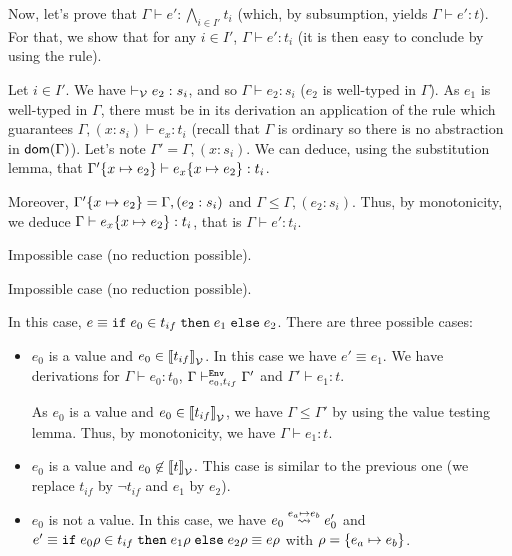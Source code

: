 \documentclass[a4paper]{article}
\theoremstyle{definition}
\begin{document}
\begin{description}
\begin{itemize}
            Now, let's prove that $\Gamma \vdash e':\bigwedge_{i\in I'} t_i$ (which, by subsumption,
            yields $\Gamma \vdash e': t$). For that, we show that for any $i\in I'$, $\Gamma \vdash e':t_i$
            (it is then easy to conclude by using the  rule).

            Let $i\in I'$. We have $\vdash_{\mathcal{V}} e_2:s_i$, and so $\Gamma \vdash e_2:s_i$ ($e_2$ is well-typed in $\Gamma$).
            As $e_1$ is well-typed in $\Gamma$, there must be in its derivation an application of the rule 
            which guarantees $\Gamma,(x:s_i) \vdash e_x:t_i$ (recall that $\Gamma$ is ordinary so there is no abstraction in $\textsf{dom}(\Gamma)$).
            Let's note $\Gamma'=\Gamma,(x:s_i)$.
            We can deduce, using the substitution lemma, that $\Gamma'\{x \mapsto e_2\} \vdash e_x\{x \mapsto e_2\}: t_i$.
           
            Moreover, $\Gamma'\{x \mapsto e_2\} = \Gamma,(e_2:s_i)$ and $\Gamma \leq \Gamma,(e_2:s_i)$.
            Thus, by monotonicity, we deduce $\Gamma \vdash e_x\{x \mapsto e_2\}: t_i$,
            that is $\Gamma \vdash e': t_i$.
          \end{itemize}
          \item[\Rule{Abs+}] Impossible case (no reduction possible).
          \item[\Rule{Abs-}] Impossible case (no reduction possible).
          \item[\Rule{Case}] In this case, $e\equiv \texttt{if}\;e_0\in t_{if}\;\texttt{then}\;e_1\;\texttt{else}\;e_2$. There are three possible cases:
          \begin{itemize}
            \item $e_0$ is a value and $e_0 \in {\llbracket t_{if} \rrbracket}_{\mathcal{V}}$. In this case we have $e' \equiv e_1$.
            We have derivations for $\Gamma \vdash e_0: t_0$, $\Gamma \vdash^{\texttt{Env}}_{e_0,t_{if}} \Gamma'$ and $\Gamma'\vdash e_1:t$.
            
            As $e_0$ is a value and $e_0 \in {\llbracket t_{if} \rrbracket}_{\mathcal{V}}$, we have $\Gamma\leq\Gamma'$ by using the value testing lemma.
            Thus, by monotonicity, we have $\Gamma\vdash e_1:t$.
            \item $e_0$ is a value and $e_0 \not\in {\llbracket t \rrbracket}_{\mathcal{V}}$. This case is similar to the previous one (we replace $t_{if}$ by $\neg t_{if}$ and $e_1$ by $e_2$).
            \item $e_0$ is not a value.
            In this case, we have $e_0\overset{e_a\mapsto e_b}{\leadsto} e_0'$ and $e'\equiv \texttt{if}\;e_0\rho\in t_{if}\;\texttt{then}\;e_1\rho\;\texttt{else}\;e_2\rho\equiv e\rho$
            with $\rho = \{e_a \mapsto e_b\}$.
            

\end{itemize}
\end{description}
\end{document}
